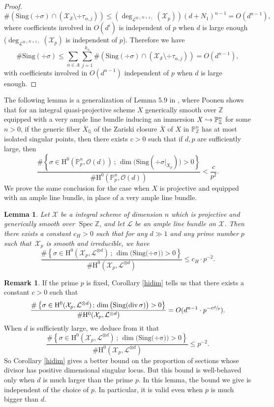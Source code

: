 \documentclass[11pt]{article}
\numberwithin{equation}{section}
\newcommand\hto{\mathrel{\lhook\joinrel\to}}
\newcommand{\sep}{\,;\,}
\theoremstyle{plain}
\newtheorem{lem}[thm]{Lemma}
\theoremstyle{definition}
\newtheorem*{rmq}{Remark}
\newcommand{\ho}{\mathrm{H}}
\newcommand{\X}{\mathcal{X}}
\newcommand{\li}{\mathcal{L}}
\newcommand{\Q}{\mathbb{Q}}
\newcommand{\Z}{\mathbb{Z}}
\newcommand{\pr}{\mathbb{P}}
\DeclareMathOperator{\Spec}{Spec}
\begin{document}
\begin{proof}
\[
\#\left(\mathrm{Sing}(\div \sigma)\cap \left(\X_{\mathcal{S}}\setminus \div \tau_{\alpha,j}\right) \right)\leq (\deg_{\li^{\otimes (N+1)}}(\X_p))(d+N_1)^{n-1}=O(d^{n-1}),
\]
where coefficients involved in $O(d^i)$ is independent of $p$ when $d$ is large enough ($\deg_{\li^{\otimes (N+1)}}(\X_p)$ is independent of $p$). Therefore we have
\[
\# \mathrm{Sing}(\div \sigma) \leq \sum_{\alpha\in A}\sum_{j=1}^{k_{\alpha}} \#\left(\mathrm{Sing}(\div \sigma)\cap \left(\X_{\mathcal{S}}\setminus \div \tau_{\alpha,j}\right) \right)=O(d^{n-1}),
\]
with coefficients involved in $O(d^{n-1})$ independent of $p$ when $d$ is large enough.
\end{proof}

The following lemma is a generalization of Lemma 5.9 in \cite{Po04}, where Poonen shows that for an integral quasi-projective scheme $X$ generically smooth over $\Z$ equipped with a very ample line bundle inducing an immersion $X\hto \pr^n_{\Z}$ for some $n>0$, if the generic fiber $\overline{X}_{\Q}$ of the Zariski closure $\overline{X}$ of $X$ in $\pr^n_{\Z}$ has at most isolated singular points, then there exists $c>0$ such that if $d,p$ are sufficiently large, then
\[
\frac{\#\left\{ \sigma\in \ho^0(\pr^n_{p},\mathcal{O}(d)) \sep \dim\bigl(\mathrm{Sing}(\div \sigma|_{X_p})\bigr)>0 \right\}}{\#\ho^0(\pr^n_{p},\mathcal{O}(d))}<\frac{c}{p^2}.
\]
We prove the same conclusion for the case when $X$ is projective and equipped with an ample line bundle, in place of a very ample line bundle.
\begin{lem}\label{posdivsing}
Let $\X$ be a integral scheme of dimension $n$ which is projective and generically smooth over $\Spec \Z$, and let $\li$ be an ample line bundle on $\X$. Then there exists a constant $c_H>0$ such that for any $d\gg 1$ and any prime number $p$ such that~$\X_p$ is smooth and irreducible, we have
\[
\frac{\#\left\{ \sigma\in \ho^0(\X_p, \li^{\otimes d})\sep \dim\big(\mathrm{Sing(\div \sigma})\big)>0 \right\}}{\#\ho^0(\X_p, \li^{\otimes d})}\leq c_H\cdot p^{-2}.
\]
\end{lem}
\begin{rmq}
If the prime $p$ is fixed, Corollary \ref{hidim} tells us that there exists a constant $c>0$ such that
\[
\frac{\#\left\{ \sigma\in \ho^0(\X_p, \li^{\otimes d})\sep \dim\big(\mathrm{Sing(\div \sigma})\big)>0 \right\}}{\#\ho^0(\X_p, \li^{\otimes d})}=O(d^{n-1}\cdot p^{-c\sfrac{d}{p}}).
\]
When $d$ is sufficiently large, we deduce from it that
\[
\frac{\#\left\{ \sigma\in \ho^0(\X_p, \li^{\otimes d})\sep \dim\big(\mathrm{Sing(\div \sigma})\big)>0 \right\}}{\#\ho^0(\X_p, \li^{\otimes d})}\leq p^{-2}.
\]
So Corollary \ref{hidim} gives a better bound on the proportion of sections whose divisor has positive dimensional singular locus. But this bound is well-behaved only when $d$ is much larger than the prime $p$. In this lemma, the bound we give is independent of the choice of $p$. In particular, it is valid even when $p$ is much bigger than $d$.
\end{rmq}
\end{document}
